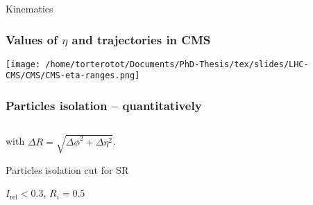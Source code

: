 \begin{frame}
\begin{block}{Kinematics}
\begin{minipage}{.55\linewidth}
\begin{center}
{}
\end{center}
\end{minipage}
\end{block}

\end{frame}

\begin{frame}
\frametitle{Values of $\eta$ and trajectories in CMS}
\begin{center}
\texttt{[image: /home/torterotot/Documents/PhD-Thesis/tex/slides/LHC-CMS/CMS/CMS-eta-ranges.png]}
\end{center}
\end{frame}



\begin{frame}\addtocounter{framenumber}{-1}
\frametitle{Particles isolation -- quantitatively}
\begin{block}{}
\begin{equation*}

\end{equation*}
\begin{center}
with $\Delta R = \sqrt{\Delta\phi^2+\Delta\eta^2}$.
\end{center}
\end{block}
\pause
\begin{block}{Particles isolation cut for SR}
\begin{center}
$I_\text{rel}<\num{0.3}$,
\qquad
$R_i = \num{0.5}$
\end{center}
\end{block}
\end{frame}


